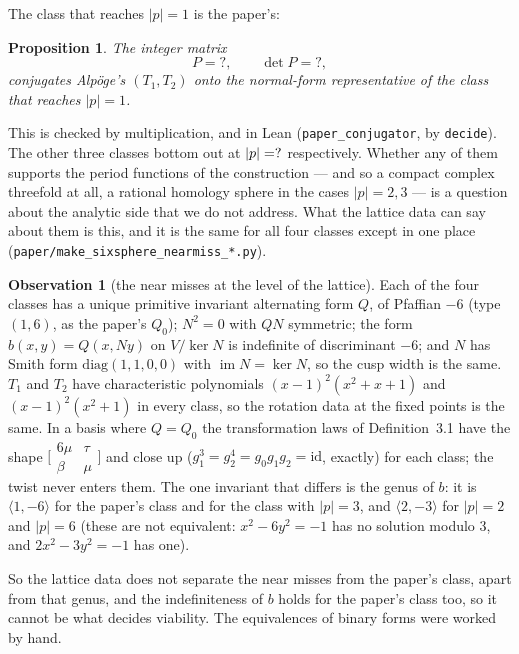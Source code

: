 \documentclass[11pt,a4paper]{article}
\newcommand{\SSPaperConj}{?}\newcommand{\SSPaperConjDet}{?}
\theoremstyle{plain}
\newtheorem{proposition}{Proposition}
\theoremstyle{definition}
\newtheorem{observation}{Observation}
\begin{document}
The class that reaches $|p| = 1$ is the paper's:

\begin{proposition}
\label{prop:paper}
The integer matrix
\[
  P = \SSPaperConj, \qquad \det P = \SSPaperConjDet,
\]
conjugates Alpöge's $(T_1, T_2)$ onto the normal-form representative of
the class that reaches $|p| = 1$.
\end{proposition}

This is checked by multiplication, and in Lean (\texttt{paper\_conjugator},
by \texttt{decide}). The other three classes bottom out at $|p| =
?$ respectively. Whether any of them supports the period
functions of the construction --- and so a compact complex threefold at all,
a rational homology sphere in the cases $|p| = 2, 3$ --- is a question about
the analytic side that we do not address. What the lattice data can say about
them is this, and it is the same for all four classes except in one place
(\texttt{paper/make\_sixsphere\_nearmiss\_*.py}).

\begin{observation}[the near misses at the level of the lattice]
\label{obs:nearmiss}
Each of the four classes has a unique primitive invariant alternating form $Q$, of
Pfaffian $-6$ (type $(1,6)$, as the paper's $Q_0$); $N^2=0$ with $QN$ symmetric; the
form $b(x,y)=Q(x,Ny)$ on $V/\ker N$ is indefinite of discriminant $-6$; and $N$ has
Smith form $\mathrm{diag}(1,1,0,0)$ with $\operatorname{im}N=\ker N$, so the cusp
width is the same. $T_1$ and $T_2$ have characteristic polynomials
$(x-1)^2(x^2+x+1)$ and $(x-1)^2(x^2+1)$ in every class, so the rotation data at the
fixed points is the same. In a basis where $Q=Q_0$ the transformation laws of
Definition~3.1 have the shape $\bigl[\begin{smallmatrix}6\mu&\tau\\\beta&\mu\end{smallmatrix}\bigr]$
and close up ($g_1^3=g_2^4=g_0g_1g_2=\mathrm{id}$, exactly) for each class; the twist
never enters them. The one invariant that differs is the genus of $b$: it is
$\langle1,-6\rangle$ for the paper's class and for the class with $|p|=3$, and
$\langle2,-3\rangle$ for $|p|=2$ and $|p|=6$ (these are not equivalent:
$x^2-6y^2=-1$ has no solution modulo $3$, and $2x^2-3y^2=-1$ has one).
\end{observation}

So the lattice data does not separate the near misses from the paper's class, apart
from that genus, and the indefiniteness of $b$ holds for the paper's class too, so it
cannot be what decides viability. The equivalences of binary forms were worked by hand.
\end{document}
